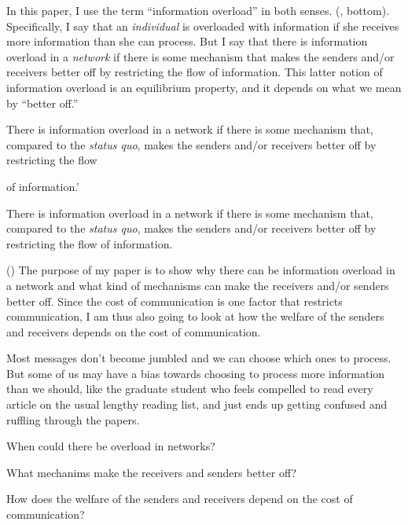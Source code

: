   In this paper, I use the term ``information overload'' in both senses.
(, bottom). Specifically, I say that an {\em individual} is
overloaded with information if she receives more information than she can
process. But I say that there is information overload in a {\em network} if
there is some mechanism that  makes the senders and/or receivers better off by
restricting the flow of  information. This latter notion of information
overload is an equilibrium property, and it depends on what we mean by
``better off.''

\begin{slide*}\label{overload}

\begin{itemize}{
  \item There is information { overload in a network if} there is
some mechanism that, compared to the {\em status quo}, makes the senders
and/or receivers better off by restricting the flow} of information.'

  \item There is information overload in a network if there is some mechanism
that, compared to the {\em status quo}, makes the senders and/or receivers
better off by restricting the flow of information.
\end{itemize}

\end{slide*}

()
  The purpose of my paper is to show why there can be information overload in
a network and what kind of mechanisms can make the receivers and/or senders
better off. Since the cost of communication is one factor that restricts
communication, I am thus also going to look at how the welfare of the senders
and receivers depends on the cost of communication.

  Most messages don't become jumbled and we can choose which ones to process. 
But some of us may have a bias towards choosing to process more information
than we should, like the graduate student who feels compelled to read every
article on the usual lengthy reading list, and just ends up getting confused
and ruffling through the papers.


\begin{slide}[7.3in,5.5in] \label{questions}

\begin{itemize}
  {\item When could {\blue there be overload} in networks?}
  \item What mechanims make the receivers and senders better off?
  \item How does the welfare {\red of the senders} and receivers depend on the
cost of communication?
\end{itemize}
\end{slide}


